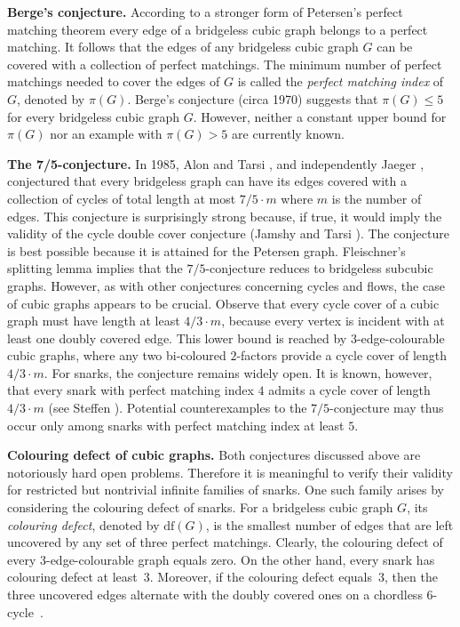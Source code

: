 \documentclass[a4paper]{amsart}
\newcommand{\df}[1]{\ensuremath{\mathrm{df}({#1})}\xspace}
\theoremstyle{plain}
\theoremstyle{definition}
\begin{document}

\textbf{Berge's conjecture.} According to a stronger form of
Petersen's perfect matching theorem every edge of a bridgeless cubic graph
belongs to a perfect matching. It follows that the edges of any
bridgeless cubic graph $G$ can be covered with a collection of
perfect matchings. The minimum number of perfect matchings
needed to cover the edges of $G$ is called the \emph{perfect
matching index} of $G$, denoted by $\pi(G)$. Berge's conjecture
(circa 1970) suggests that $\pi(G)\leq 5$ for every bridgeless
cubic graph $G$. However, neither a constant upper bound for
$\pi(G)$ nor an example with $\pi(G)>5$ are currently known.


\textbf{The 7/5-conjecture.} In 1985, Alon and Tarsi \cite{AT},
and independently Jaeger \cite{Raspaud-diss}, conjectured that
every bridgeless graph can have its edges covered with a
collection of cycles of total length at most $7/5\cdot m$ where
$m$ is the number of edges. This conjecture is surprisingly
strong because, if true, it would imply the validity of the
cycle double cover conjecture (Jamshy and Tarsi \cite{JT}). The
conjecture is best possible because it is attained for the
Petersen graph. Fleischner's splitting lemma
\cite[Lemma~III.26]{F} implies that the $7/5$-conjecture
reduces to bridgeless subcubic graphs. However, as with other
conjectures concerning cycles and flows, the case of cubic
graphs appears to be crucial. Observe that every cycle cover of
a cubic graph must have length at least $4/3\cdot m$, because
every vertex is incident with at least one doubly covered edge.
This lower bound is reached by $3$-edge-colourable cubic
graphs, where any two bi-coloured $2$-factors provide a cycle
cover of length $4/3\cdot m$. For snarks, the conjecture
remains widely open. It is known, however, that every snark
with perfect matching index $4$ admits a cycle cover of length
$4/3\cdot m$ (see Steffen \cite[Theorem~3.1]{S2}). Potential
counterexamples to the $7/5$-conjecture may thus occur only
among snarks with perfect matching index at least $5$.

\textbf{Colouring defect of cubic graphs.} Both conjectures
discussed above are notoriously hard open problems. Therefore
it is meaningful to verify their validity for restricted but
nontrivial infinite families of snarks. One such family arises
by considering the colouring defect of snarks. For a bridgeless
cubic graph $G$, its \emph{colouring defect}, denoted by
$\df{G}$, is the smallest number of edges that are left
uncovered by any set of three perfect matchings. Clearly, the
colouring defect of every $3$-edge-colourable graph equals
zero. On the other hand, every snark has colouring defect at
least~$3$. Moreover, if the colouring defect equals~$3$, then
the three uncovered edges alternate with the doubly covered
ones on a chordless $6$-cycle~\cite{S2}.
\end{document}
